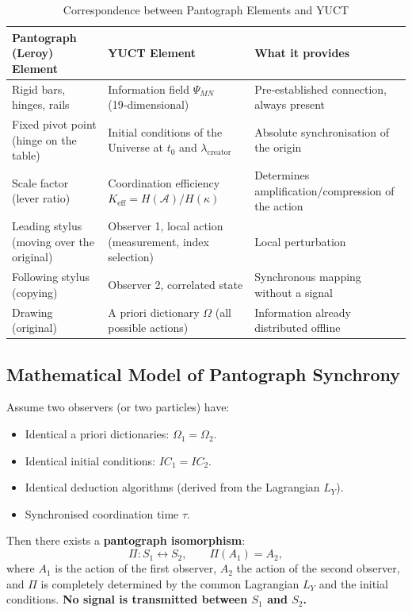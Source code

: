 \documentclass[12pt,a4paper]{article}
\begin{document}
	\begin{table}[htbp]
		\centering
		\caption{Correspondence between Pantograph Elements and YUCT}
		\label{tab:pantograf}
		\begin{tabular}{|p{3.5cm}|p{3.5cm}|p{5.5cm}|}
			\hline
			\textbf{Pantograph (Leroy) Element} & \textbf{YUCT Element} & \textbf{What it provides} \\
			\hline
			Rigid bars, hinges, rails & Information field \(\Psi_{MN}\) (19‑dimensional) & Pre‑established connection, always present \\
			\hline
			Fixed pivot point (hinge on the table) & Initial conditions of the Universe at \(t_0\) and \(\lambda_{\mathrm{creator}}\) & Absolute synchronisation of the origin \\
			\hline
			Scale factor (lever ratio) & Coordination efficiency \(K_{\mathrm{eff}} = H(\mathcal{A})/H(\kappa)\) & Determines amplification/compression of the action \\
			\hline
			Leading stylus (moving over the original) & Observer 1, local action (measurement, index selection) & Local perturbation \\
			\hline
			Following stylus (copying) & Observer 2, correlated state & Synchronous mapping without a signal \\
			\hline
			Drawing (original) & A priori dictionary \(\Omega\) (all possible actions) & Information already distributed offline \\
			\hline
		\end{tabular}
	\end{table}
	
	\subsection{Mathematical Model of Pantograph Synchrony}
	
	Assume two observers (or two particles) have:
	\begin{itemize}
		\item Identical a priori dictionaries: \(\Omega_1 = \Omega_2\).
		\item Identical initial conditions: \(IC_1 = IC_2\).
		\item Identical deduction algorithms (derived from the Lagrangian \(L_Y\)).
		\item Synchronised coordination time \(\tau\).
	\end{itemize}
	
	Then there exists a \textbf{pantograph isomorphism}:
	\[
	\Pi: S_1 \leftrightarrow S_2, \qquad \Pi(A_1) = A_2,
	\]
	where \(A_1\) is the action of the first observer, \(A_2\) the action of the second observer, and \(\Pi\) is completely determined by the common Lagrangian \(L_Y\) and the initial conditions. \textbf{No signal is transmitted between \(S_1\) and \(S_2\).}
	
\end{document}

